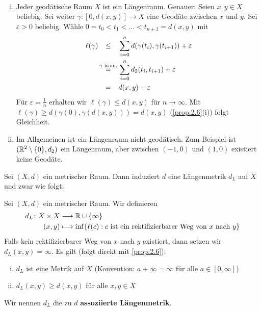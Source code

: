 \begin{beispiel}
\label{bsp:2.8}
	\mbox{} \\[-1.4cm]
	\begin{enumerate}[(i)]
		\item Jeder geodätische Raum $X$ ist ein Längenraum.
		Genauer:
		Seien $x,y \in X$ beliebig.
		Sei weiter $\gamma\colon [0,d(x,y)] \rightarrow X$ eine Geodäte zwischen $x$ und $y$.
		Sei $\varepsilon > 0$ beliebig.
		Wähle $0 = t_0 < t_1 < \dots < t_{n+1} = d(x,y)$ mit
		\begin{align*}
			\ell(\gamma) &\stack{}{\leq} \sum\limits_{i=0}^{n} d(\gamma(t_i),\gamma(t_{i+1})) + \varepsilon \\
			&\stack{\gamma\text{ isom.}}{=} \sum\limits_{i=0}^{n} d_2(t_i,t_{i+1}) + \varepsilon \\
			&\stack{}{=} d(x,y) + \varepsilon
		\end{align*}
		Für $\varepsilon = \frac{1}{n}$ erhalten wir $\ell(\gamma) \leq d(x,y)$ für $n \rightarrow \infty$. Mit $\ell(\gamma) \geq d(\gamma(0),\gamma(d(x,y))) = d(x,y)$ (\autoref{prop:2.6}(i)) folgt Gleichheit.
		\item Im Allgemeinen ist ein Längenraum nicht geodätisch.
		Zum Beispiel ist $(\mathbb{R}^2 \setminus \{0\},d_2)$ ein Längenraum, aber zwischen $(-1,0)$ und $(1,0)$ existiert keine Geodäte.
	\end{enumerate}
\end{beispiel}

Sei $(X,d)$ ein metrischer Raum.
Dann induziert $d$ eine Längenmetrik $d_L$ auf $X$ und zwar wie folgt:

\begin{definition}
\label{def:2.9}
	Sei $(X,d)$ ein metrischer Raum.
	Wir definieren
	\begin{align*}
		d_L \colon X \times X &\longrightarrow \mathbb{R} \cup \{\infty\} \\
		(x,y) &\longmapsto \inf\{ \ell(c) : c \text{ ist ein rektifizierbarer Weg von } x \text{ nach } y\}
	\end{align*}	
	Falls kein rektifizierbarer Weg von $x$ nach $y$ existiert, dann setzen wir $d_L(x,y) = \infty$.
	Es gilt (folgt direkt mit \autoref{prop:2.6}):
	\begin{enumerate}[(i)]
		\item $d_L$ ist eine Metrik auf $X$ (Konvention: $a + \infty = \infty$ für alle $a \in [0,\infty]$)
		\item $d_L(x,y) \geq d(x,y)$ für alle $x,y \in X$
	\end{enumerate}
	Wir nennen $d_L$ die zu $d$ \textbf{assoziierte Längenmetrik}. 
\end{definition}


